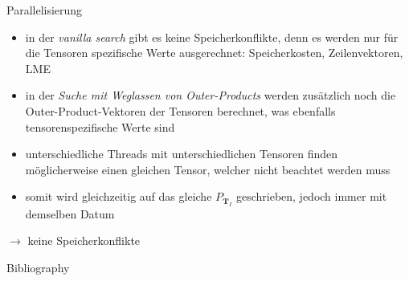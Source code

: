 \documentclass{beamer}
\begin{document}
			\begin{frame}{Parallelisierung}
				\begin{itemize}
					\item in der \textit{vanilla search} gibt es keine Speicherkonflikte, denn es werden nur für die Tensoren spezifische Werte ausgerechnet: Speicherkosten, Zeilenvektoren, LME \pause
					\item in der \textit{Suche mit Weglassen von Outer-Products} werden zusätzlich noch die Outer-Product-Vektoren der Tensoren berechnet, was ebenfalls tensorenspezifische Werte sind
					\item unterschiedliche Threads mit unterschiedlichen Tensoren finden möglicherweise einen gleichen Tensor, welcher nicht beachtet werden muss
					\item somit wird gleichzeitig auf das gleiche $P_{\bm{T}_I}$ geschrieben, jedoch immer mit demselben Datum
				\end{itemize} \pause
				$\rightarrow$ keine Speicherkonflikte
			\end{frame}
	
	
	\begin{frame}[allowframebreaks]{Bibliography}
		
		
	\end{frame}
	
\end{document}
